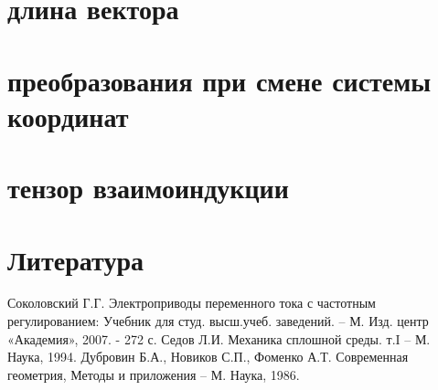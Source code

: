 \documentclass[14pt]{beamer}
\begin{document}

\section{длина вектора}





\section{преобразования при смене системы координат}

\section{тензор взаимоиндукции}


\begin{frame}

\end{frame}


\begin{frame}

\end{frame}



\section{Литература}
\begin{thebibliography}{3}
	Соколовский Г.Г. Электроприводы переменного тока с частотным регулированием: Учебник для студ. высш.учеб. заведений. 
		-- М. Изд. центр «Академия», 2007. - 272 с.		
	Седов Л.И. Механика сплошной среды. т.I -- М. Наука, 1994. 
	Дубровин Б.А., Новиков С.П., Фоменко А.Т. Современная геометрия, Методы и приложения -- М. Наука, 1986.
\end{thebibliography}
\end{document}
